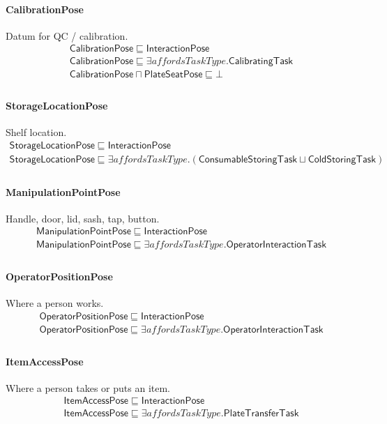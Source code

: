 \documentclass[10pt]{article}
\begin{document}
\paragraph{CalibrationPose} Datum for QC / calibration.
\[\begin{array}{l}
\mathsf{CalibrationPose} \sqsubseteq  \mathsf{InteractionPose} \\
\mathsf{CalibrationPose} \sqsubseteq  \exists \mathit{affordsTaskType}.\mathsf{CalibratingTask} \\
\mathsf{CalibrationPose} \sqcap  \mathsf{PlateSeatPose} \sqsubseteq  \bot  \\
\end{array}\]
\paragraph{StorageLocationPose} Shelf location.
\[\begin{array}{l}
\mathsf{StorageLocationPose} \sqsubseteq  \mathsf{InteractionPose} \\
\mathsf{StorageLocationPose} \sqsubseteq  \exists \mathit{affordsTaskType}.(\mathsf{ConsumableStoringTask} \sqcup  \mathsf{ColdStoringTask}) \\
\end{array}\]
\paragraph{ManipulationPointPose} Handle, door, lid, sash, tap, button.
\[\begin{array}{l}
\mathsf{ManipulationPointPose} \sqsubseteq  \mathsf{InteractionPose} \\
\mathsf{ManipulationPointPose} \sqsubseteq  \exists \mathit{affordsTaskType}.\mathsf{OperatorInteractionTask} \\
\end{array}\]
\paragraph{OperatorPositionPose} Where a person works.
\[\begin{array}{l}
\mathsf{OperatorPositionPose} \sqsubseteq  \mathsf{InteractionPose} \\
\mathsf{OperatorPositionPose} \sqsubseteq  \exists \mathit{affordsTaskType}.\mathsf{OperatorInteractionTask} \\
\end{array}\]
\paragraph{ItemAccessPose} Where a person takes or puts an item.
\[\begin{array}{l}
\mathsf{ItemAccessPose} \sqsubseteq  \mathsf{InteractionPose} \\
\mathsf{ItemAccessPose} \sqsubseteq  \exists \mathit{affordsTaskType}.\mathsf{PlateTransferTask} \\
\end{array}\]
\end{document}
